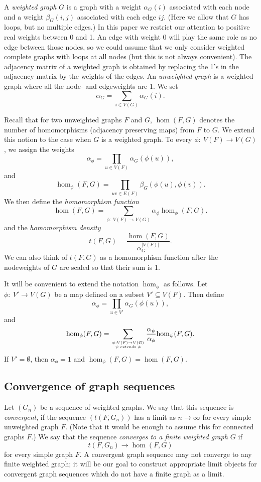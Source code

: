 \documentclass[fleqn]{article}
\begin{document}
A {\it weighted graph} $G$ is a graph with a weight $\alpha_G(i)$
associated with each node and a weight $\beta_G(i,j)$ associated with
each edge $ij$. (Here we allow that $G$ has loops, but no multiple
edges.) In this paper we restrict our attention to positive real
weights between 0 and 1. An edge with weight 0 will play the same
role as no edge between those nodes, so we could assume that we only
consider weighted complete graphs with loops at all nodes (but this
is not always convenient). The adjacency matrix of a weighted graph
is obtained by replacing the 1's in the adjacency matrix by the
weights of the edges. An {\it unweighted graph} is a weighted graph
where all the node- and edgeweights are 1. We set
\[
\alpha_G=\sum_{i\in V(G)} \alpha_G(i).
\]

Recall that for two unweighted graphs $F$ and $G$, $\hom(F,G)$
denotes the number of homomorphisms (adjacency preserving maps) from
$F$ to $G$. We extend this notion to the case when $G$ is a weighted
graph. To every $\phi:~V(F)\to V(G)$, we assign the weights
\[
\alpha_\phi=\prod_{u\in V(F)} \alpha_G(\phi(u)),
\]
and
\[
\hom_{\phi}(F,G)=\prod_{uv\in E(F)} \beta_G(\phi(u),\phi(v)).
\]
We then define the {\it homomorphism function}
\begin{equation}\label{HOMSUM}
\hom(F,G)=\sum_{\phi:~V(F)\to V(G)} \alpha_\phi \hom_\phi(F,G).
\end{equation}
and the {\it homomorphism density}
\[
t(F,G)=\frac{\hom(F,G)}{\alpha_G^{|V(F)|}}.
\]
We can also think of $t(F,G)$ as a homomorphism function after the
nodeweights of $G$ are scaled so that their sum is 1.

It will be convenient to extend the notation $\hom_\phi$ as follows.
Let $\phi:~V'\to V(G)$ be a map defined on a subset $V'\subseteq
V(F)$. Then define
\[
\alpha_\phi=\prod_{u\in V'} \alpha_G(\phi(u)),
\]
and
\[
\hom_\phi(F,G)= \sum_{\ontop{\psi: V(F)\to
V(G)}{\psi\text{~extends~}\phi}}
\frac{\alpha_\psi}{\alpha_\phi}\hom_\psi(F,G).
\]
If $V'=\emptyset$, then $\alpha_\phi=1$ and
$\hom_\phi(F,G)=\hom(F,G)$.

\subsection{Convergence of graph sequences}

Let $(G_n)$ be a sequence of weighted graphs. We say that this
sequence is {\it convergent}, if the sequence $(t(F,G_n))$ has a
limit as $n\to\infty$ for every simple unweighted graph $F$. (Note
that it would be enough to assume this for connected graphs $F$.) We
say that the sequence {\it converges to a finite weighted graph $G$}
if
\[
t(F,G_n)\longrightarrow \hom(F,G)
\]
for every simple graph $F$. A convergent graph sequence may not
converge to any finite weighted graph; it will be our goal to
construct appropriate limit objects for convergent graph sequences
which do not have a finite graph as a limit.
\end{document}
